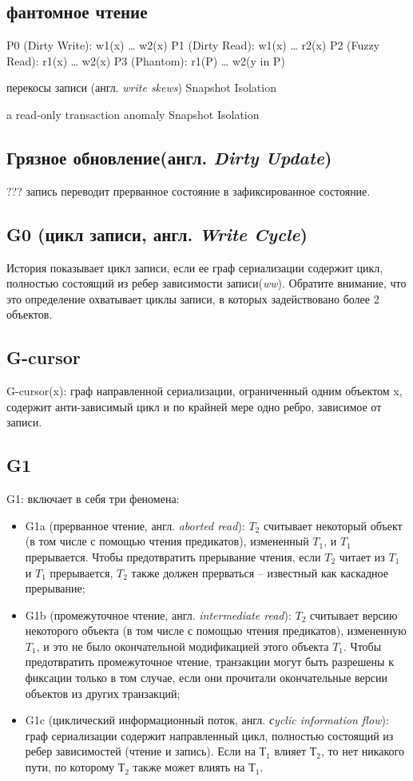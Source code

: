 \documentclass[12pt,  openany]{book}
\begin{document}
\subsection{фантомное чтение}
P0 (Dirty Write): w1(x) … w2(x)
P1 (Dirty Read): w1(x) … r2(x)
P2 (Fuzzy Read): r1(x) … w2(x)
P3 (Phantom): r1(P) … w2(y in P)

перекосы записи (англ. \textit{write skews})
Snapshot Isolation

a read-only transaction anomaly
Snapshot Isolation

\subsection{Грязное обновление(англ. \textit{Dirty Update})}
???
запись переводит прерванное состояние в зафиксированное состояние.

\subsection{G0 (цикл записи, англ. \textit{Write Cycle})}
История показывает цикл записи, если ее граф  сериализации содержит цикл, полностью состоящий из ребер зависимости записи(\textit{ww}). Обратите внимание, что это определение охватывает циклы записи, в которых задействовано более 2 объектов.

\subsection{G-cursor}
G-cursor(x): граф направленной сериализации, ограниченный одним объектом x, содержит анти-зависимый цикл и по крайней мере одно ребро, зависимое от записи.

\subsection{G1}
G1: включает в себя три феномена: 
\begin{itemize}
\item G1a (прерванное чтение, англ. \textit{aborted read}): $T_2$ считывает некоторый объект (в том числе с помощью чтения предикатов), измененный $T_1$, и $T_1$ прерывается. Чтобы предотвратить прерывание чтения, если $T_2$ читает из $T_1$ и $T_1$ прерывается, $T_2$ также должен прерваться – известный как каскадное прерывание;
\item G1b (промежуточное чтение, англ. \textit{intermediate read}): $T_2$ считывает версию некоторого объекта (в том числе с помощью чтения предикатов), измененную $T_1$, и это не было окончательной модификацией этого объекта $T_1$. Чтобы предотвратить промежуточное чтение, транзакции могут быть разрешены к фиксации только в том случае, если они прочитали окончательные версии объектов из других транзакций;
\item G1c (циклический информационный поток, англ. \textit{сyclic information flow}): граф сериализации содержит направленный цикл, полностью состоящий из ребер зависимостей (чтение и запись). Если на $Т_1$ влияет $Т_2$, то нет никакого пути, по которому $Т_2$ также может влиять на $Т_1$.
\end{itemize}
\end{document}

